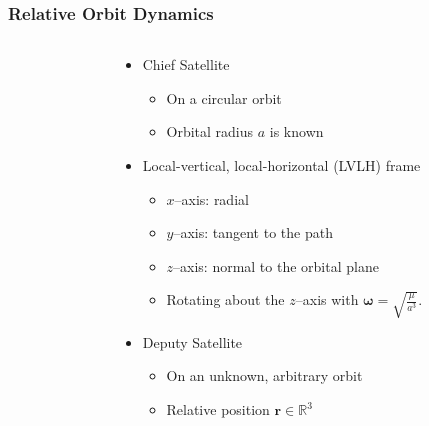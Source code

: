 \documentclass[hyperref={pdftex,pdfpagemode=none,pdfstartview=FitH},10pt]{beamer}
\renewcommand{\Re}{\ensuremath{\mathbb{R}}}
\begin{document}
\begin{frame}
\frametitle{Relative Orbit Dynamics}

\begin{columns}
\begin{column}{6.5cm}
\footnotesize\selectfont
{}
\end{column}
%
\begin{column}{6cm}
\begin{itemize}
\item Chief Satellite
	\begin{itemize}
	\item On a circular orbit
	\item Orbital radius $a$ is known
	\end{itemize}
\vspace*{0.3cm}\pause
\item Local-vertical, local-horizontal (LVLH) frame
	\begin{itemize}
	\item $x$--axis: radial
	\item $y$--axis: tangent to the path
	\item $z$--axis: normal to the orbital plane
	\item Rotating about the $z$--axis with $\mathbf{\omega}=\sqrt{\frac{\mu}{a^3}}$.
	\end{itemize}
\vspace*{0.3cm}\pause
\item Deputy Satellite
	\begin{itemize}
	\item On an unknown, arbitrary orbit\\
	\item Relative position $\mathbf{r}\in\Re^3$

	\end{itemize}
\end{itemize}
\end{column}
\end{columns}
\end{frame}
\end{document}
